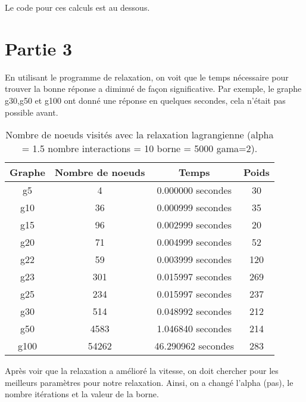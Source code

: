 \documentclass[a4paper,11pt]{article}
\begin{document}
Le code pour ces calculs est au dessous.
\begin{multicols}{2}
  
\end{multicols}


\section*{Partie 3}

En utilisant le programme de relaxation, on voit que le temps nécessaire
pour trouver la bonne réponse a  diminué de façon significative. Par exemple, le
graphe g30,g50 et g100 ont donné  une réponse en quelques secondes, cela n'était
pas possible avant.

\begin{table}[h!]
\begin{centering}
\begin{tabular}{|c|c|c|c|}
\hline 
Graphe & Nombre de noeuds & Temps & Poids\tabularnewline
\hline 
\hline 
g5 & 4 & 0.000000 secondes  & 30\tabularnewline
\hline 
g10 & 36 & 0.000999 secondes & 35\tabularnewline
\hline 
g15 & 96 & 0.002999 secondes & 20\tabularnewline
\hline 
g20 & 71 & 0.004999 secondes & 52\tabularnewline
\hline 
g22 & 59 & 0.003999 secondes & 120\tabularnewline
\hline 
g23 & 301 & 0.015997 secondes  & 269\tabularnewline
\hline 
g25 & 234 & 0.015997 secondes  & 237\tabularnewline
\hline 
g30 & 514 & 0.048992 secondes & 212\tabularnewline
\hline 
g50 & 4583 & 1.046840 secondes  & 214\tabularnewline
\hline 
g100 & 54262  & 46.290962 secondes  & 283\tabularnewline
\hline 
\end{tabular}
\par\end{centering}

\caption{Nombre de noeuds visités avec la relaxation lagrangienne (alpha =
1.5 nombre interactions = 10 borne = 5000 gama=2). }
\end{table}


\newpage
Après voir  que la relaxation a amélioré  la vitesse, on doit  chercher pour les
meilleurs paramètres pour notre relaxation.
Ainsi, on a changé l'alpha (pas), le nombre itérations et la valeur de la borne.
\end{document}
